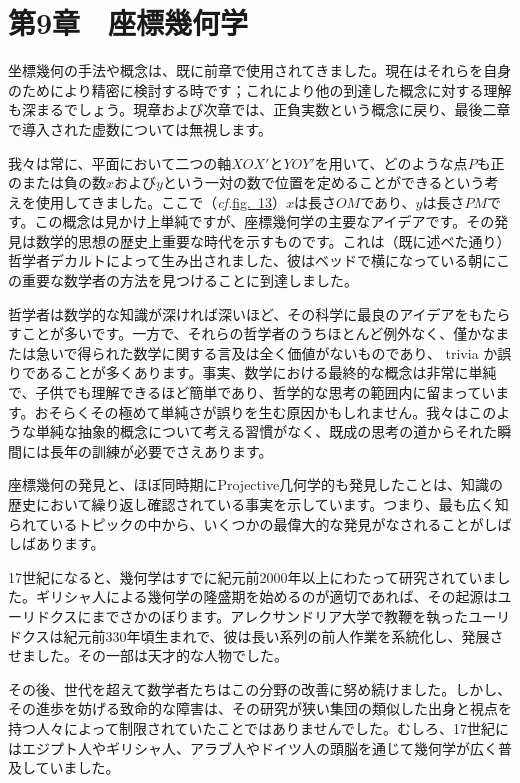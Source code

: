 \documentclass[a4paper,11pt,openany]{ltjsbook}
\providecommand{\Fig}[2][Fig.]{\hyperref[fig:#2]{#1~#2}}
\providecommand{\cf}{\emph{cf.}}
\begin{document}
\chapter{第9章　座標幾何学}

坐標幾何の手法や概念は、既に前章で使用されてきました。現在はそれらを自身のためにより精密に検討する時です；これにより他の到達した概念に対する理解も深まるでしょう。現章および次章では、正負実数という概念に戻り、最後二章で導入された虚数については無視します。

我々は常に、平面において二つの軸$XOX'$と$YOY'$を用いて、どのような点$P$も正のまたは負の数$x$および$y$という一対の数で位置を定めることができるという考えを使用してきました。ここで（\cf \Fig[fig.]{13}）$x$は長さ$OM$であり、$y$は長さ$PM$です。この概念は見かけ上単純ですが、座標幾何学の主要なアイデアです。その発見は数学的思想の歴史上重要な時代を示すものです。これは（既に述べた通り）哲学者デカルトによって生み出されました{}、彼はベッドで横になっている朝にこの重要な数学者の方法を見つけることに到達しました。

哲学者は数学的な知識が深ければ深いほど、その科学に最良のアイデアをもたらすことが多いです。一方で、それらの哲学者のうちほとんど例外なく、僅かなまたは急いで得られた数学に関する言及は全く価値がないものであり、 trivia か誤りであることが多くあります。事実、数学における最終的な概念は非常に単純で、子供でも理解できるほど簡単であり、哲学的な思考の範囲内に留まっています。おそらくその極めて単純さが誤りを生む原因かもしれません。我々はこのような単純な抽象的概念について考える習慣がなく、既成の思考の道からそれた瞬間には長年の訓練が必要でさえあります。

座標幾何の発見と、ほぼ同時期にProjective几何学的も発見したことは、知識の歴史において繰り返し確認されている事実を示しています。つまり、最も広く知られているトピックの中から、いくつかの最偉大的な発見がなされることがしばしばあります。

17世紀になると、幾何学はすでに紀元前2000年以上にわたって研究されていました。ギリシャ人による幾何学の隆盛期を始めるのが適切であれば、その起源はユーリドクスにまでさかのぼります。アレクサンドリア大学で教鞭を執ったユーリドクスは紀元前330年頃生まれで、彼は長い系列の前人作業を系統化し、発展させました。その一部は天才的な人物でした。

その後、世代を超えて数学者たちはこの分野の改善に努め続けました。しかし、その進歩を妨げる致命的な障害は、その研究が狭い集団の類似した出身と視点を持つ人々によって制限されていたことではありませんでした。むしろ、17世紀にはエジプト人やギリシャ人、アラブ人やドイツ人の頭脳を通じて幾何学が広く普及していました。
\end{document}
